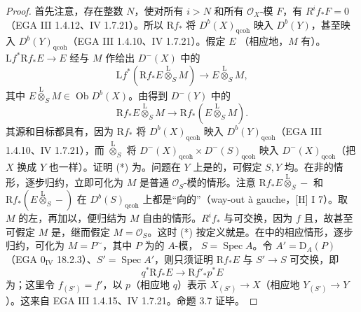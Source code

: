 \begin{proof}
首先注意，存在整数 $N$，使对所有 $i>N$ 和所有 $\mathcal O_X$-模 $F$，有 $R^if_*F=0$（EGA III 1.4.12、IV 1.7.21）。所以 $\mathrm Rf_*$ 将 $D^b(X)_{\mathrm{qcoh}}$ 映入 $D^b(Y)$，甚至映入 $D^b(Y)_{\mathrm{qcoh}}$（EGA III 1.4.10、IV 1.7.21）。假定 $E$ （相应地，$M$ 有）。 $\mathrm Lf^*\mathrm Rf_*E\to E$ 经与 $M$ 作给出 $D^-(X)$ 中的
\[\mathrm Lf^*(\mathrm Rf_*E\mathbin{\overset{\mathrm L}{\otimes}}_SM)\longrightarrow E\mathbin{\overset{\mathrm L}{\otimes}}_SM,\]
其中 $E\mathbin{\overset{\mathrm L}{\otimes}}_SM\in\operatorname{Ob}D^b(X)$。由得到 $D^-(Y)$ 中的
\[\mathrm Rf_*E\mathbin{\overset{\mathrm L}{\otimes}}_SM\longrightarrow\mathrm Rf_*(E\mathbin{\overset{\mathrm L}{\otimes}}_SM).\tag{*}\]
其源和目标都具有，因为 $\mathrm Rf_*$ 将 $D^b(X)_{\mathrm{qcoh}}$ 映入 $D^b(Y)_{\mathrm{qcoh}}$（EGA III 1.4.10、IV 1.7.21），而 $\mathbin{\overset{\mathrm L}{\otimes}}_S$ 将 $D^-(X)_{\mathrm{qcoh}}\times D^-(S)_{\mathrm{qcoh}}$ 映入 $D^-(X)_{\mathrm{qcoh}}$（把 $X$ 换成 $Y$ 也一样）。证明 (*) 为。问题在 $Y$ 上是的，可假定 $S,Y$ 均。在非的情形，逐步归约，立即可化为 $M$ 是普通 $\mathcal O_S$-模的情形。注意 $\mathrm Rf_*E\mathbin{\overset{\mathrm L}{\otimes}}_S-$ 和 $\mathrm Rf_*(E\mathbin{\overset{\mathrm L}{\otimes}}_S-)$ 在 $D^b(S)_{\mathrm{qcoh}}$ 上都是“向的”（way-out à gauche，[H] I 7）。取 $M$ 的左，再加以，便归结为 $M$ 自由的情形。$R^if_*$ 与可交换，因为 $f$ 且，故甚至可假定 $M$ 是，继而假定 $M=\mathcal O_S$。这时 (*) 按定义就是。在中的相应情形，逐步归约，可化为 $M=P^{\sim}$，其中 $P$ 为的 $A$-模，
$S=\operatorname{Spec}A$。令 $A'=\mathrm D_A(P)$（EGA $0_{\mathrm{IV}}$ 18.2.3）、$S'=\operatorname{Spec}A'$，则只须证明 $\mathrm Rf_*E$ 与 $S'\to S$ 可交换，即
\[q^*\mathrm Rf_*E\longrightarrow\mathrm Rf'_*p^*E\]
为；这里令 $f_{(S')}=f'$，以 $p$（相应地 $q$）表示 $X_{(S')}\to X$（相应地 $Y_{(S')}\to Y$）。这来自 EGA III 1.4.15、IV 1.7.21。命题 3.7 证毕。
\end{proof}
